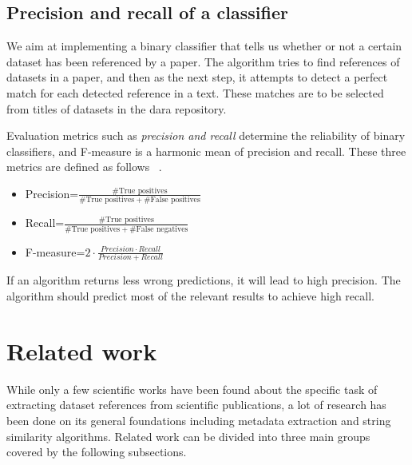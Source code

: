 \documentclass{IOS-Book-Article}
\newcommand{\dara}{\textsf{da\textbar ra}}
\begin{document}
\subsection{Precision and recall of a classifier}
\label{sec:precision-recall}
We aim at implementing a binary classifier that tells us whether or not a certain dataset has been referenced by a paper. The algorithm tries to find references of datasets in a paper, and then as the next step, it attempts to detect a perfect match for each detected reference in a text. These matches are to be selected from titles of datasets in the {\dara} repository. 

Evaluation metrics such as \emph{precision and recall} determine the reliability of binary classifiers, and F-measure is a harmonic mean of precision and recall. 
These three metrics are defined as follows ~\cite{Powers2011}. 
\begin{itemize}
	\item Precision=$\frac{\#\text{True\ positives}}{\#\text{True positives}+\#\text{False positives}}$
	\item Recall=$\frac{\#\text{True positives}}{\#\text{True positives}+\#\text{False negatives}}$
	\item F-measure=$2\cdot{\frac{\mathit{Precision}\cdot\mathit{Recall}}{\mathit{Precision}+\mathit{Recall}}}$
\end{itemize}

If an algorithm returns less wrong predictions, it will lead to high precision. The algorithm should predict most of the relevant results to achieve high recall.

\section{Related work}
\label{sec:relWork}
While only a few scientific works have been found about the specific task of extracting dataset references from scientific publications, a lot of research has been done on its general foundations including metadata extraction and string similarity algorithms. 
Related work can be divided into three main groups covered by the following subsections.
\end{document}
